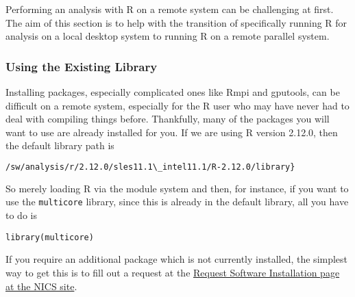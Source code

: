 Performing an analysis with R on a remote system can be challenging at first.  The aim of this section is to help with the transition of specifically running R for analysis on a local desktop system to running R on a remote parallel system.


\subsubsection{Using the Existing Library}
Installing packages, especially complicated ones like Rmpi and gputools, can be difficult on a remote system, especially for the R user who may have never had to deal with compiling things before.  Thankfully, many of the packages you will want to use are already installed for you.  If we are using R version 2.12.0, then the default library path is
\begin{lstlisting}[language=sh]
/sw/analysis/r/2.12.0/sles11.1\_intel11.1/R-2.12.0/library} 
\end{lstlisting}%
So merely loading R via the module system and then, for instance, if you want to use the \texttt{multicore} library, since this is already in the default library, all you have to do is
\begin{lstlisting}[language=rr]
library(multicore)
\end{lstlisting}
If you require an additional package which is not currently installed, the simplest way to get this is to fill out a request at the \href{http://www.nics.tennessee.edu/software-request}{Request Software Installation page at the NICS site}.

